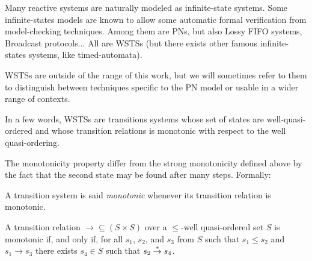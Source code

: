 Many reactive systems are naturally modeled as infinite-state systems.
Some infinite-states models are known to allow some automatic formal verification from model-checking techniques.
Among them are \acp{PN}, but also Lossy FIFO systems, Broadcast protocols...
All are \acp{WSTS} (but there exists other famous infinite-states systems, like timed-automata).

\acp{WSTS} are outside of the range of this work, but we will sometimes refer to them to distinguish between techniques specific to the \ac{PN} model or usable in a wider range of contexts.

In a few words, \acp{WSTS} are transitions systems whose set of states are well-quasi-ordered and whose transition relations is monotonic with respect to the well quasi-ordering.

The monotonicity property differ from the strong monotonicity defined above by the fact that the second state may be found after many steps. Formally:
\begin{defi}[Monotonicity]
  A transition system is said \emph{monotonic} whenever  its transition relation is monotonic.

  A transition relation $\rightarrow \subseteq (S \times S)$ over a $\leq$-well quasi-ordered set $S$ is monotonic if, and only if, for all $s_1$, $s_2$, and $s_3$ from $S$ such that $s_1 \leq s_2$ and $s_1 \rightarrow s_3$ there exists $s_4 \in S$ such that $s_2 \stackrel{*}{\to} s_4$.
\end{defi}
